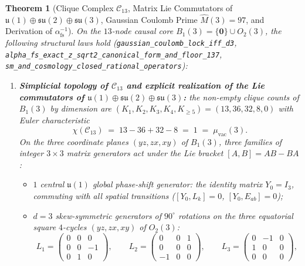 \documentclass[11pt,a4paper]{article}
\theoremstyle{plain}
\newtheorem{theorem}{Theorem}[section]
\theoremstyle{definition}
\begin{document}
\begin{theorem}[Clique Complex $\mathcal{C}_{13}$, Matrix Lie Commutators of $\mathfrak{u}(1)\oplus\mathfrak{su}(2)\oplus\mathfrak{su}(3)$, Gaussian Coulomb Prime $\widehat{M}(3)=97$, and Derivation of $\alpha_{\mathrm{fs}}^{-1}$]
\label{thm:sm-alpha}
On the $13$-node causal core $B_1(3) = \{\mathbf{0}\}\cup O_2(3)$, the following structural laws hold (\texttt{gaussian\_coulomb\_lock\_iff\_d3}, \texttt{alpha\_fs\_exact\_z\_sqrt2\_canonical\_form\_and\_floor\_137}, \texttt{sm\_and\_cosmology\_closed\_rational\_operators}):
\begin{enumerate}[label=\textbf{(\arabic*)},leftmargin=*]
\item \textbf{Simplicial topology of $\mathcal{C}_{13}$ and explicit realization of the Lie commutators of $\mathfrak{u}(1)\oplus\mathfrak{su}(2)\oplus\mathfrak{su}(3)$:}
  the non-empty clique counts of $B_1(3)$ by dimension are $(K_1, K_2, K_3, K_4, K_{\ge 5}) = (13, 36, 32, 8, 0)$ with Euler characteristic
  \begin{equation}
    \label{eq:c13-euler-char}
    \chi(\mathcal{C}_{13}) \;=\; 13 - 36 + 32 - 8 \;=\; 1 \;=\; \mu_{\mathrm{vac}}(3).
  \end{equation}
  On the three coordinate planes $(yz, zx, xy)$ of $B_1(3)$, three families of integer $3\times 3$ matrix generators act under the Lie bracket $[A, B] = AB - BA$:
  \begin{itemize}[leftmargin=*]
  \item $1$ central $\mathfrak{u}(1)$ global phase-shift generator: the identity matrix $Y_0 = I_3$, commuting with all spatial transitions ($[Y_0, L_k] = 0$, $[Y_0, E_{ab}] = 0$);
  \item $d = 3$ skew-symmetric generators of $90^\circ$ rotations on the three equatorial square $4$-cycles $(yz, zx, xy)$ of $O_2(3)$:
    \begin{equation}
      \label{eq:su2-generators-matrices}
      L_1 = \begin{pmatrix} 0 & 0 & 0 \\ 0 & 0 & -1 \\ 0 & 1 & 0 \end{pmatrix}, \qquad
      L_2 = \begin{pmatrix} 0 & 0 & 1 \\ 0 & 0 & 0 \\ -1 & 0 & 0 \end{pmatrix}, \qquad
      L_3 = \begin{pmatrix} 0 & -1 & 0 \\ 1 & 0 & 0 \\ 0 & 0 & 0 \end{pmatrix},

\end{equation}
\end{itemize}
\end{enumerate}
\end{theorem}
\end{document}
